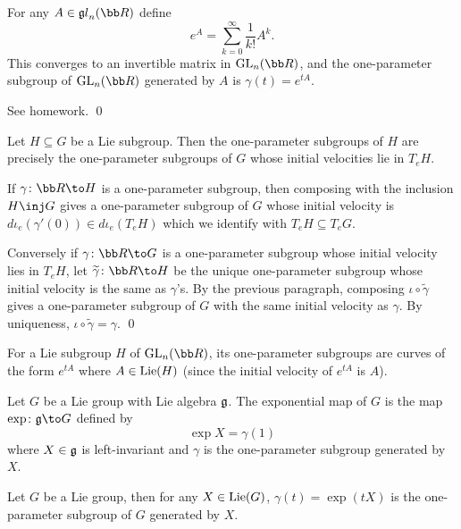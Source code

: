 \bprop

    For any $A\in\lgl_n(\bR)$ define
    $$ e^A = \sum_{k=0}^\infty\frac1{k!}A^k . $$
    This converges to an invertible matrix in $\gl_n(\bR)$, and the one-parameter subgroup of $\gl_n(\bR)$ generated by $A$
    is $\gamma(t)=e^{tA}$.

\eprop

\bproof

    See homework.
    \qed

\eproof

\bprop

    Let $H\subseteq G$ be a Lie subgroup.
    Then the one-parameter subgroups of $H$ are precisely the one-parameter subgroups of $G$ whose initial velocities lie in $T_eH$.

\eprop

\bproof

    If $\gamma\colon\bR\to H$ is a one-parameter subgroup, then composing with the inclusion $H\inj G$ gives a one-parameter subgroup of $G$
    whose initial velocity is $d\iota_e(\gamma'(0))\in d\iota_e(T_eH)$ which we identify with $T_eH\subseteq T_eG$.

    Conversely if $\gamma\colon\bR\to G$ is a one-parameter subgroup whose initial velocity lies in $T_eH$, let $\tilde\gamma\colon\bR\to H$
    be the unique one-parameter subgroup whose initial velocity is the same as $\gamma$'s.
    By the previous paragraph, composing $\iota\circ\tilde\gamma$ gives a one-parameter subgroup of $G$ with the same initial velocity as
    $\gamma$.
    By uniqueness, $\iota\circ\tilde\gamma=\gamma$.
    \qed

\eproof

\bexam

    For a Lie subgroup $H$ of $\gl_n(\bR)$, its one-parameter subgroups are curves of the form $e^{tA}$ where $A\in{\rm Lie}(H)$ (since the initial
    velocity of $e^{tA}$ is $A$).

\eexam

\bdefn

    Let $G$ be a Lie group with Lie algebra ${{\frak g}}$.
    The {\emphcolor exponential map} of $G$ is the map $\exp\colon\g\to G$ defined by
    $$ \exp X = \gamma(1) $$
    where $X\in{{\frak g}}$ is left-invariant and $\gamma$ is the one-parameter subgroup generated by $X$.

\edefn

\bprop

    Let $G$ be a Lie group, then for any $X\in{\rm Lie}(G)$, $\gamma(t)=\exp(tX)$ is the one-parameter subgroup of $G$ generated by $X$.

